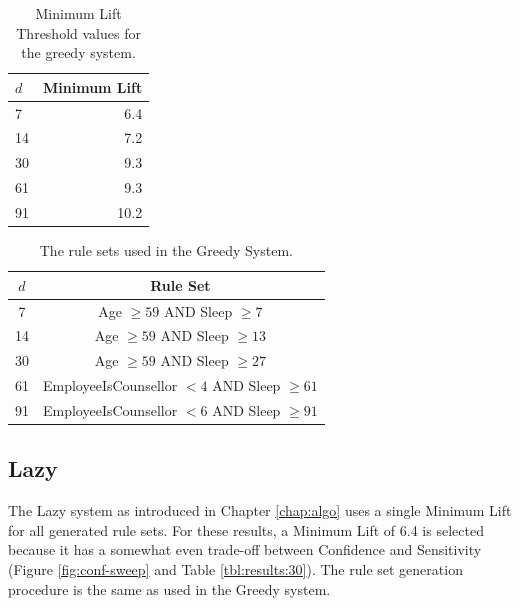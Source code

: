 \begin{table}[h]
	\centering

	\begin{tabular}{lr}
	\toprule
	{$d$} &  Minimum Lift \\
	\midrule
	7     & 6.4 \\
	14    & 7.2 \\
	30    & 9.3 \\
	61    & 9.3 \\
	91    & 10.2 \\

	\bottomrule
	\end{tabular}

	\caption{Minimum Lift Threshold values for the greedy system.}
	\label{tbl:results:mltgreedy}
\end{table}


\begin{table}[h]
	\centering

	\begin{tabular}{cc}
	\toprule
	$d$ & Rule Set \\
	\midrule
	7	& Age $\geq 59$ AND Sleep $\geq 7$ \\
	\midrule
	14	& Age $\geq 59$ AND Sleep $\geq 13$ \\
	\midrule
	30	& Age $\geq 59$ AND Sleep $\geq 27$ \\
	\midrule
	61	& EmployeeIsCounsellor $< 4$ AND Sleep $\geq 61$ \\
	\midrule
	91	& EmployeeIsCounsellor $< 6$ AND Sleep $\geq 91$ \\

	\bottomrule
	\end{tabular}

	\caption{The rule sets used in the Greedy System.}
	\label{tbl:results:greedysets}
\end{table}



\subsection{Lazy}

The Lazy system as introduced in Chapter \ref{chap:algo} uses a single Minimum Lift for all generated rule sets. For these results, a Minimum Lift of 6.4 is selected because it has a somewhat even trade-off between Confidence and Sensitivity (Figure \ref{fig:conf-sweep} and Table \ref{tbl:results:30}). The rule set generation procedure is the same as used in the Greedy system.

